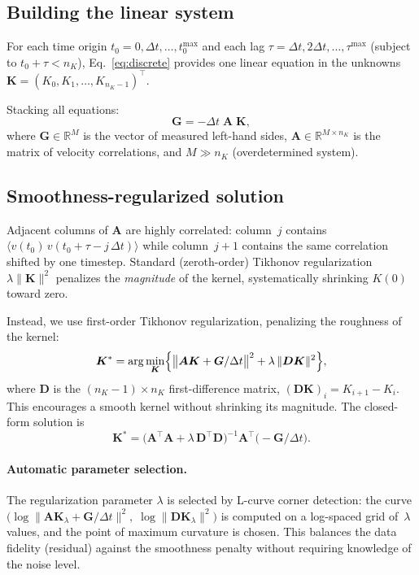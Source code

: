\documentclass[11pt]{article}
\newcommand{\avg}[1]{\langle #1 \rangle}
\newcommand{\dt}{\Delta t}
\begin{document}
\subsection{Building the linear system}

For each time origin $t_0 = 0, \dt, \ldots, t_0^{\max}$ and each lag
$\tau = \dt, 2\dt, \ldots, \tau^{\max}$ (subject to $t_0 + \tau < n_K$),
Eq.~\eqref{eq:discrete} provides one linear equation in the unknowns
$\bm{K} = (K_0, K_1, \ldots, K_{n_K-1})^\top$.

Stacking all equations:
\begin{equation}\label{eq:linsys}
  \bm{G} = -\dt\;\bm{A}\;\bm{K},
\end{equation}
where $\bm{G} \in \mathbb{R}^M$ is the vector of measured left-hand sides,
$\bm{A} \in \mathbb{R}^{M \times n_K}$ is the matrix of velocity correlations,
and $M \gg n_K$ (overdetermined system).

\subsection{Smoothness-regularized solution}

Adjacent columns of $\bm{A}$ are highly correlated: column~$j$ contains
$\avg{v(t_0)\,v(t_0{+}\tau{-}j\,\dt)}$ while column~$j{+}1$ contains
the same correlation shifted by one timestep.
Standard (zeroth-order) Tikhonov regularization $\lambda\|\bm{K}\|^2$
penalizes the \emph{magnitude} of the kernel, systematically shrinking
$K(0)$ toward zero.

Instead, we use first-order Tikhonov regularization, penalizing the
roughness of the kernel:
\begin{equation}
  \bm{K}^*
  = \arg\min_{\bm{K}}
    \Bigl\{
      \bigl\|\bm{A}\bm{K} + \bm{G}/\dt\bigr\|^2
      + \lambda\,\|\bm{D}\bm{K}\|^2
    \Bigr\},
\end{equation}
where $\bm{D}$ is the $(n_K{-}1) \times n_K$ first-difference matrix,
$(\bm{D}\bm{K})_i = K_{i+1} - K_i$.
This encourages a smooth kernel without shrinking its magnitude.
The closed-form solution is
\begin{equation}\label{eq:solution}
  \boxed{
  \bm{K}^*
  = \bigl(\bm{A}^\top\bm{A} + \lambda\,\bm{D}^\top\bm{D}\bigr)^{-1}
    \bm{A}^\top\bigl(-\bm{G}/\dt\bigr).
  }
\end{equation}

\paragraph{Automatic parameter selection.}
The regularization parameter $\lambda$ is selected by L-curve corner
detection: the curve $\bigl(\log\|\bm{A}\bm{K}_\lambda + \bm{G}/\dt\|^2,\;
\log\|\bm{D}\bm{K}_\lambda\|^2\bigr)$ is computed on a log-spaced grid
of~$\lambda$ values, and the point of maximum curvature is chosen.
This balances the data fidelity (residual) against the smoothness penalty
without requiring knowledge of the noise level.
\end{document}
